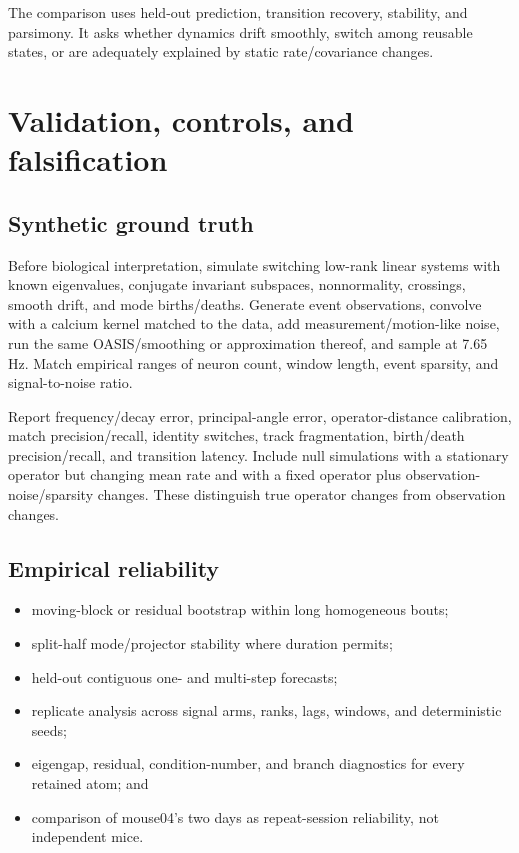 \documentclass[11pt,a4paper]{article}
\begin{document}
The comparison uses held-out prediction, transition recovery, stability, and parsimony. It asks whether dynamics drift smoothly, switch among reusable states, or are adequately explained by static rate/covariance changes.

\section{Validation, controls, and falsification}

\subsection{Synthetic ground truth}

Before biological interpretation, simulate switching low-rank linear systems with known eigenvalues, conjugate invariant subspaces, nonnormality, crossings, smooth drift, and mode births/deaths. Generate event observations, convolve with a calcium kernel matched to the data, add measurement/motion-like noise, run the same OASIS/smoothing or approximation thereof, and sample at 7.65 Hz. Match empirical ranges of neuron count, window length, event sparsity, and signal-to-noise ratio.

Report frequency/decay error, principal-angle error, operator-distance calibration, match precision/recall, identity switches, track fragmentation, birth/death precision/recall, and transition latency. Include null simulations with a stationary operator but changing mean rate and with a fixed operator plus observation-noise/sparsity changes. These distinguish true operator changes from observation changes.

\subsection{Empirical reliability}

\begin{itemize}
  \item moving-block or residual bootstrap within long homogeneous bouts;
  \item split-half mode/projector stability where duration permits;
  \item held-out contiguous one- and multi-step forecasts;
  \item replicate analysis across signal arms, ranks, lags, windows, and deterministic seeds;
  \item eigengap, residual, condition-number, and branch diagnostics for every retained atom; and
  \item comparison of mouse04's two days as repeat-session reliability, not independent mice.
\end{itemize}
\end{document}

